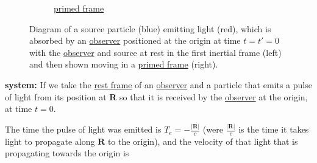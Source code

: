 \begin{figure}[ht]
\begin{subfigure}[b]{.49\textwidth}
		\caption{\hyperlink{def-Primed-Frame}{primed frame}}
	\end{subfigure}
	\caption{Diagram of a source particle (blue) emitting light (red), which is absorbed by an \protect\hyperlink{def-observer}{observer} positioned at the origin at time $t=t{'}=0$ with the \protect\hyperlink{def-observer}{observer} and source at rest in the first inertial frame (left) and then shown moving in a \protect\hyperlink{def-Primed-Frame}{primed frame} (right).}
	\label{fig: Retarded field}
\end{figure}

\noindent
\textbf{system:} \newline
If we take the \hyperlink{def-proper-frame}{rest frame} of an \hyperlink{def-observer}{observer} and a particle that emits a pulse of light from its position at $\mathbf{R}$ so that it is received by the \hyperlink{def-observer}{observer} at the origin, at time $t=0$.

The time the pulse of light was emitted is ${T}_{e}= -\frac{|\mathbf{R}|}{c}$ (were $\frac{|\mathbf{R}|}{c}$ is the time it takes light to propagate along $\mathbf{R}$ to the origin), and the velocity of that light that is propagating towards the origin is


